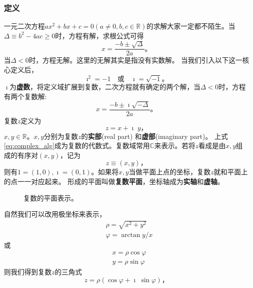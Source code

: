 \subsubsection{定义}
一元二次方程$a x^2 + b x + c = 0 (a\neq 0, b,c \in \mathbb{R})$的求解大家一定都不陌生。当$\Delta \equiv b^2 - 4 a c \geq 0$时，方程有解，求根公式可得
\begin{equation}
    x = \frac{-b \pm \sqrt{\Delta}}{2a} \textrm{。}
\end{equation}
当$\Delta < 0$时，方程无解。这里的无解其实是指没有实数解。
当我们引入以下这一核心定义后，
\begin{equation}
    \imath ^2 = -1 \quad \textrm{或} \quad \imath = \sqrt{-1} \textrm{。} 
\end{equation}
$\imath$为{\bf 虚数}，将定义域扩展到复数，二次方程就有确定的两个解，当$\Delta < 0$时，方程有两个复数解:
\begin{equation}
    x = \frac{-b \pm \imath \sqrt{-\Delta}}{2a} \textrm{。}
\end{equation}
复数$z$定义为
\begin{equation}
    \label{eq:complex_alg}
    z = x + \imath \; y \textrm{，}
\end{equation}
$x,y \in {\mathbb{R}}$。$x,y$分别为复数$z$的{\bf 实部}(real part) 和{\bf 虚部}(imaginary part)。
上式\eqref{eq:complex_alg}成为复数的代数式。复数域常用$\mathbb{C}$来表示。若将$z$看成是由$x,y$组成的有序对$(x,y)$，记为
\begin{equation}
    z \equiv (x,y)\textrm{，}
\end{equation}
则有$1 = (1,0), \imath = (0, 1)$。如果将$x,y$当做平面上点的坐标，复数$z$就和平面上的点一一对应起来。
形成的平面叫做{\bf 复数平面}，坐标轴成为{\bf 实轴}和{\bf 虚轴}。
\begin{figure}[htb]
    \centering
    
  \caption{复数的平面表示。} \label{fig:complex_plane}
\end{figure} 
自然我们可以改用极坐标来表示，
\begin{align}
    & \rho = \sqrt{x^2 + y^2}\\
    & \varphi = \arctan y/x
\end{align}
或
\begin{align}
    & x = \rho \cos\varphi \\
    & y = \rho \sin\varphi 
\end{align}
则我们得到复数$z$的三角式
\begin{equation}
    z = \rho (\cos\varphi +  \imath\; \sin\varphi) \textrm{，}
\end{equation}
